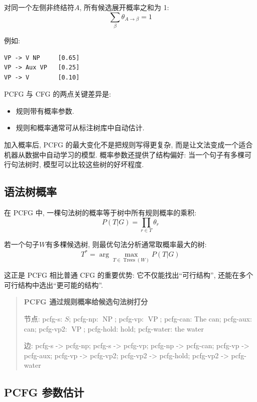 对同一个左侧非终结符$A$, 所有候选展开概率之和为 1:
\[
\sum_{\beta} \theta_{A \to \beta} = 1
\]

例如:

\begin{Verbatim}[breaklines=true,breakanywhere=true,fontsize=\small]
VP -> V NP     [0.65]
VP -> Aux VP   [0.25]
VP -> V        [0.10]
\end{Verbatim}

PCFG 与 CFG 的两点关键差异是:

\begin{itemize}
\item 规则带有概率参数.
\item 规则和概率通常可从标注树库中自动估计.
\end{itemize}

加入概率后, PCFG 的最大变化不是把规则写得更复杂,
而是让文法变成一个适合机器从数据中自动学习的模型.
概率参数还提供了结构偏好: 当一个句子有多棵可行句法树时,
模型可以比较这些树的好坏程度.

\subsection{语法树概率}


在 PCFG 中, 一棵句法树的概率等于树中所有规则概率的乘积:
\[
P(T | G) = \prod_{r \in T} \theta_r
\]

若一个句子$W$有多棵候选树, 则最优句法分析通常取概率最大的树:
\[
T^* = \arg\max_{T \in \operatorname{Trees}(W)} P(T | G)
\]

这正是 PCFG 相比普通 CFG 的重要优势:
它不仅能找出“可行结构”, 还能在多个可行结构中选出“更可能的结构”.

\begin{quote}
\small
\textbf{PCFG 通过规则概率给候选句法树打分}
\par 节点: pcfg-s: $S$; pcfg-np: $\operatorname{NP}$; pcfg-vp: $\operatorname{VP}$; pcfg-can: The can; pcfg-aux: can; pcfg-vp2: $\operatorname{VP}$; pcfg-hold: hold; pcfg-water: the water
\par 边: pcfg-s -\textgreater{} pcfg-np; pcfg-s -\textgreater{} pcfg-vp; pcfg-np -\textgreater{} pcfg-can; pcfg-vp -\textgreater{} pcfg-aux; pcfg-vp -\textgreater{} pcfg-vp2; pcfg-vp2 -\textgreater{} pcfg-hold; pcfg-vp2 -\textgreater{} pcfg-water
\end{quote}

\subsection{PCFG 参数估计}


